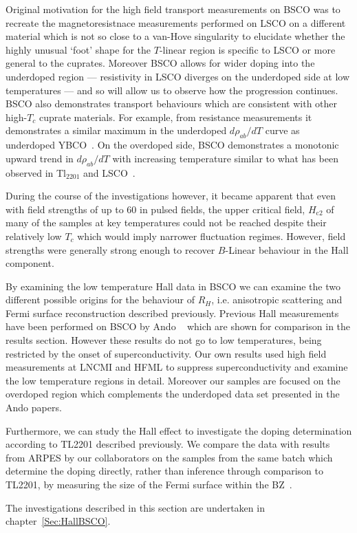 Original motivation for the high field transport measurements on \ac{BSCO} was to recreate the magnetoresistnace measurements performed on \ac{LSCO} on a different material which is not so close to a van-Hove singularity to elucidate whether the highly unusual `foot' shape for the $T$-linear region is specific to \ac{LSCO} or more general to the cuprates. Moreover \ac{BSCO} allows for wider doping into the underdoped region --- resistivity in \ac{LSCO} diverges on the underdoped side at low temperatures --- and so will allow us to observe how the progression continues.  \ac{BSCO} also demonstrates transport behaviours which are consistent with other high-$T_c$ cuprate materials. For example, from resistance measurements it demonstrates a similar maximum in the underdoped $d\rho_{ab}/dT$ curve as underdoped YBCO~\cite{Ando1999}. On the overdoped side, \ac{BSCO} demonstrates a monotonic upward trend in $d\rho_{ab}/dT$ with increasing temperature similar to what has been observed in Tl$_{2201}$ and \ac{LSCO}~\cite{Ando1999}.

During the course of the investigations however, it became apparent that even with field strengths of up to \unit{60}{\tesla} in pulsed fields, the upper critical field, $H_{\textrm{c2}}$ of many of the samples at key temperatures could not be reached despite their relatively low $T_c$ which would imply narrower fluctuation regimes. However, field strengths were generally strong enough to recover $B$-Linear behaviour in the Hall component.

By examining the low temperature Hall data in \ac{BSCO} we can examine the two different possible origins for the behaviour of $R_H$, i.e. anisotropic scattering and Fermi surface reconstruction described previously. Previous Hall measurements have been performed on \ac{BSCO} by Ando \etal~\cite{Ando1999, Ando2000} which are shown for comparison in the results section. However these results do not go to low temperatures, being restricted by the onset of superconductivity. Our own results used high field measurements at \ac{LNCMI} and \ac{HFML} to suppress superconductivity and examine the low temperature regions in detail. Moreover our samples are focused on the overdoped region which complements the underdoped data set presented in the Ando papers.

Furthermore, we can study the Hall effect to investigate the doping determination according to \ac{TL2201} described previously. We compare the data with results from \ac{ARPES} by our collaborators on the samples from the same batch which determine the doping directly, rather than inference through comparison to \ac{TL2201}, by measuring the size of the Fermi surface within the \ac{BZ}~\cite{Kondo2004}.

The investigations described in this section are undertaken in chapter~\ref{Sec:HallBSCO}.


